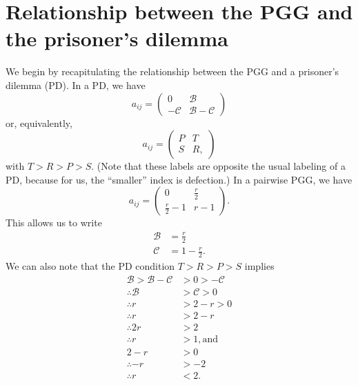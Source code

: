 \documentclass[13pt]{amsart}
\newcommand{\B}{\mathcal{B}}
\newcommand{\C}{\mathcal{C}}
\begin{document}
\section{Relationship between the PGG and the prisoner's dilemma}
We begin by recapitulating the relationship between the PGG and a prisoner's dilemma (PD).
In a PD, we have
\begin{equation}
    a_{ij} =
    \begin{pmatrix}
        0 & \B \\
        -\C & \B - \C
    \end{pmatrix}
\end{equation}
or, equivalently,
\begin{equation}
    a_{ij} =
    \begin{pmatrix}
        P & T \\
        S & R,
    \end{pmatrix}
\end{equation}
with $T > R > P > S$.
(Note that these labels are opposite the usual labeling of a PD, because for us, the ``smaller'' index is defection.)
In a pairwise PGG, we have
\begin{equation}
    a_{ij} =
    \begin{pmatrix}
        0 & \frac{r}{2} \\
        \frac{r}{2} - 1 & r - 1
    \end{pmatrix}.
\end{equation}
This allows us to write
\begin{equation}
    \begin{split}
        \mathcal{B} & = \frac{r}{2}\\
        \mathcal{C} & = 1 - \frac{r}{2}.
    \end{split}
\end{equation}
We can also note that the PD condition $T > R > P > S$ implies
\begin{equation}
    \begin{split}
        \mathcal{B} > \mathcal{B} - \mathcal{C} & > 0 > -\mathcal{C} \\
        \therefore \mathcal{B} & > \mathcal{C} > 0 \\
        \therefore r & > 2 - r > 0 \\
        \therefore r & > 2 - r \\
        \therefore 2r & > 2 \\
        \therefore r & > 1, \text{and}\\
        2 - r & > 0\\
        \therefore -r & > -2\\
        \therefore r & < 2.
    \end{split}
\end{equation}
\end{document}
